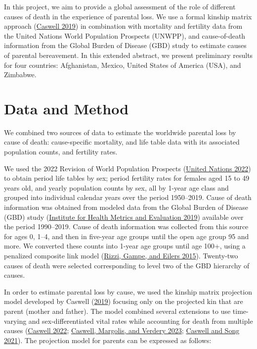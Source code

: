 \documentclass[
  11pt,
  letterpaper,
]{article}
\begin{document}
In this project, we aim to provide a global assessment of the role of different causes of death in the experience of parental loss. We use a formal kinship matrix approach (\protect\hyperlink{ref-caswell2019formal}{Caswell 2019}) in combination with mortality and fertility data from the United Nations World Population Prospects (UNWPP), and cause-of-death information from the Global Burden of Disease (GBD) study to estimate causes of parental bereavement. In this extended abstract, we present preliminary results for four countries: Afghanistan, Mexico, United States of America (USA), and Zimbabwe.

\hypertarget{data-and-method}{%
\section{Data and Method}\label{data-and-method}}

We combined two sources of data to estimate the worldwide parental loss by cause of death: cause-specific mortality, and life table data with its associated population counts, and fertility rates.

We used the 2022 Revision of World Population Prospects (\protect\hyperlink{ref-united2022world}{United Nations 2022}) to obtain period life tables by sex; period fertility rates for females aged 15 to 49 years old, and yearly population counts by sex, all by 1-year age class and grouped into individual calendar years over the period 1950--2019. Cause of death information was obtained from modeled data from the Global Burden of Disease (GBD) study (\protect\hyperlink{ref-ihme2019gbd}{Institute for Health Metrics and Evaluation 2019}) available over the period 1990--2019. Cause of death information was collected from this source for ages 0, 1--4, and then in five-year age groups until the open age group 95 and more. We converted these counts into 1-year age groups until age 100+, using a penalized composite link model (\protect\hyperlink{ref-rizzi2015efficient}{Rizzi, Gampe, and Eilers 2015}). Twenty-two causes of death were selected corresponding to level two of the GBD hierarchy of causes.

In order to estimate parental loss by cause, we used the kinship matrix projection model developed by Caswell (\protect\hyperlink{ref-caswell2019formal}{2019}) focusing only on the projected kin that are parent (mother and father). The model combined several extensions to use time-varying and sex-differentiated vital rates while accounting for death from multiple causes (\protect\hyperlink{ref-caswell2022formal}{Caswell 2022}; \protect\hyperlink{ref-caswell2023formal}{Caswell, Margolis, and Verdery 2023}; \protect\hyperlink{ref-caswell2021formal}{Caswell and Song 2021}). The projection model for parents can be expressed as follows:
\end{document}
